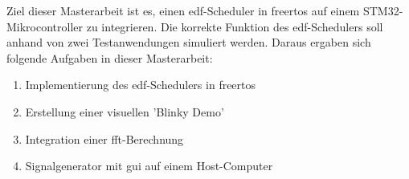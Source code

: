 \documentclass[../EDF Master Thesis.tex]{subfiles}
\begin{document}
    Ziel dieser Masterarbeit ist es, einen \ac{edf}-Scheduler in \ac{freertos} auf einem STM32-Mikrocontroller zu integrieren.
    Die korrekte Funktion des \ac{edf}-Schedulers soll anhand von zwei Testanwendungen simuliert werden.
    Daraus ergaben sich folgende Aufgaben in dieser Masterarbeit:
    \begin{enumerate}
        \item Implementierung des \ac{edf}-Schedulers in \ac{freertos}
        \item Erstellung einer visuellen 'Blinky Demo'
        \item Integration einer \ac{fft}-Berechnung
        \item Signalgenerator mit \ac{gui} auf einem Host-Computer
    \end{enumerate}
\end{document}
